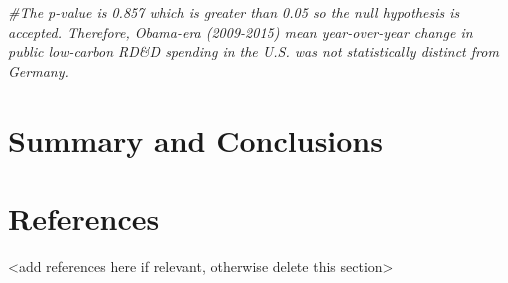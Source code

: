 \documentclass[
  12pt,
]{article}
\newenvironment{Shaded}{\begin{snugshade}}{\end{snugshade}}
\newcommand{\CommentTok}[1]{\textcolor[rgb]{0.56,0.35,0.01}{\textit{#1}}}
\begin{document}
\begin{Shaded}
\begin{Highlighting}[]
          \CommentTok{\#The p{-}value is 0.857 which is greater than 0.05 so the null hypothesis is accepted. Therefore, Obama{-}era (2009{-}2015) mean year{-}over{-}year change in public low{-}carbon RD\&D spending in the U.S. was not statistically distinct from Germany.}
\end{Highlighting}
\end{Shaded}

\newpage

\hypertarget{summary-and-conclusions}{%
\section{Summary and Conclusions}\label{summary-and-conclusions}}

\newpage

\hypertarget{references}{%
\section{References}\label{references}}

\textless add references here if relevant, otherwise delete this
section\textgreater{}
\end{document}
